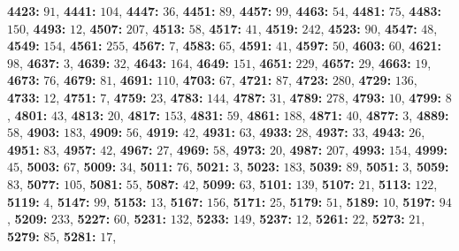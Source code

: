 \textsf{\bfseries 4423:} $91$, \textsf{\bfseries 4441:} $104$, \textsf{\bfseries 4447:} $36$, \textsf{\bfseries 4451:} $89$, \textsf{\bfseries 4457:} $99$, \textsf{\bfseries 4463:} $54$, \textsf{\bfseries 4481:} $75$, \textsf{\bfseries 4483:} $150$, \textsf{\bfseries 4493:} $12$, \textsf{\bfseries 4507:} $207$, \textsf{\bfseries 4513:} $58$, \textsf{\bfseries 4517:} $41$, \textsf{\bfseries 4519:} $242$, \textsf{\bfseries 4523:} $90$, \textsf{\bfseries 4547:} $48$, \textsf{\bfseries 4549:} $154$, \textsf{\bfseries 4561:} $255$, \textsf{\bfseries 4567:} $7$, \textsf{\bfseries 4583:} $65$, \textsf{\bfseries 4591:} $41$, \textsf{\bfseries 4597:} $50$, \textsf{\bfseries 4603:} $60$, \textsf{\bfseries 4621:} $98$, \textsf{\bfseries 4637:} $3$, \textsf{\bfseries 4639:} $32$, \textsf{\bfseries 4643:} $164$, \textsf{\bfseries 4649:} $151$, \textsf{\bfseries 4651:} $229$, \textsf{\bfseries 4657:} $29$, \textsf{\bfseries 4663:} $19$, \textsf{\bfseries 4673:} $76$, \textsf{\bfseries 4679:} $81$, \textsf{\bfseries 4691:} $110$, \textsf{\bfseries 4703:} $67$, \textsf{\bfseries 4721:} $87$, \textsf{\bfseries 4723:} $280$, \textsf{\bfseries 4729:} $136$, \textsf{\bfseries 4733:} $12$, \textsf{\bfseries 4751:} $7$, \textsf{\bfseries 4759:} $23$, \textsf{\bfseries 4783:} $144$, \textsf{\bfseries 4787:} $31$, \textsf{\bfseries 4789:} $278$, \textsf{\bfseries 4793:} $10$, \textsf{\bfseries 4799:} $8$, \textsf{\bfseries 4801:} $43$, \textsf{\bfseries 4813:} $20$, \textsf{\bfseries 4817:} $153$, \textsf{\bfseries 4831:} $59$, \textsf{\bfseries 4861:} $188$, \textsf{\bfseries 4871:} $40$, \textsf{\bfseries 4877:} $3$, \textsf{\bfseries 4889:} $58$, \textsf{\bfseries 4903:} $183$, \textsf{\bfseries 4909:} $56$, \textsf{\bfseries 4919:} $42$, \textsf{\bfseries 4931:} $63$, \textsf{\bfseries 4933:} $28$, \textsf{\bfseries 4937:} $33$, \textsf{\bfseries 4943:} $26$, \textsf{\bfseries 4951:} $83$, \textsf{\bfseries 4957:} $42$, \textsf{\bfseries 4967:} $27$, \textsf{\bfseries 4969:} $58$, \textsf{\bfseries 4973:} $20$, \textsf{\bfseries 4987:} $207$, \textsf{\bfseries 4993:} $154$, \textsf{\bfseries 4999:} $45$, \textsf{\bfseries 5003:} $67$, \textsf{\bfseries 5009:} $34$, \textsf{\bfseries 5011:} $76$, \textsf{\bfseries 5021:} $3$, \textsf{\bfseries 5023:} $183$, \textsf{\bfseries 5039:} $89$, \textsf{\bfseries 5051:} $3$, \textsf{\bfseries 5059:} $83$, \textsf{\bfseries 5077:} $105$, \textsf{\bfseries 5081:} $55$, \textsf{\bfseries 5087:} $42$, \textsf{\bfseries 5099:} $63$, \textsf{\bfseries 5101:} $139$, \textsf{\bfseries 5107:} $21$, \textsf{\bfseries 5113:} $122$, \textsf{\bfseries 5119:} $4$, \textsf{\bfseries 5147:} $99$, \textsf{\bfseries 5153:} $13$, \textsf{\bfseries 5167:} $156$, \textsf{\bfseries 5171:} $25$, \textsf{\bfseries 5179:} $51$, \textsf{\bfseries 5189:} $10$, \textsf{\bfseries 5197:} $94$, \textsf{\bfseries 5209:} $233$, \textsf{\bfseries 5227:} $60$, \textsf{\bfseries 5231:} $132$, \textsf{\bfseries 5233:} $149$, \textsf{\bfseries 5237:} $12$, \textsf{\bfseries 5261:} $22$, \textsf{\bfseries 5273:} $21$, \textsf{\bfseries 5279:} $85$, \textsf{\bfseries 5281:} $17$, 
